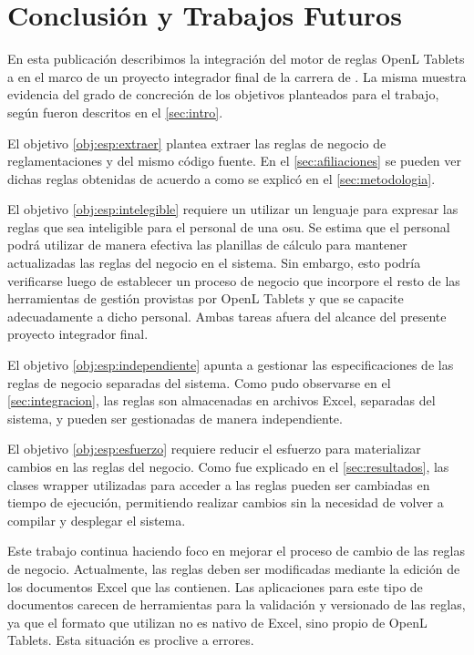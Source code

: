 \section{Conclusión y Trabajos Futuros}\label{sec:conclusiones}

En esta publicación describimos la integración del motor de reglas OpenL Tablets a
{\SIDOSPU} en el marco de un proyecto integrador final de la carrera de {\CARRERA}.
%
La misma muestra evidencia del grado de concreción de los objetivos planteados para el trabajo, según fueron descritos en el \cref{sec:intro}. 

El objetivo \ref{obj:esp:extraer} plantea extraer las reglas de negocio de reglamentaciones y del mismo código fuente. 
En el \cref{sec:afiliaciones} se pueden ver dichas reglas obtenidas de acuerdo a como se explicó en el \cref{sec:metodologia}. 

El objetivo \ref{obj:esp:intelegible} requiere un utilizar un lenguaje para expresar las reglas que sea inteligible para el personal de una \acrshort{osu}.
Se estima que el personal podrá utilizar de manera efectiva las planillas de cálculo para mantener actualizadas las reglas del negocio en el sistema.
Sin embargo, esto podría verificarse luego de establecer un proceso de negocio que incorpore el resto de las herramientas de gestión provistas por OpenL Tablets y que se capacite adecuadamente a dicho personal. 
Ambas tareas afuera del alcance del presente proyecto integrador final.

El objetivo \ref{obj:esp:independiente} apunta a gestionar las especificaciones de las reglas de negocio separadas del sistema. 
Como pudo observarse en el \cref{sec:integracion}, las reglas son almacenadas en archivos Excel, separadas del sistema, y pueden ser gestionadas de manera independiente.

El objetivo \ref{obj:esp:esfuerzo} requiere reducir el esfuerzo para materializar cambios en las reglas del negocio.
Como fue explicado en el \cref{sec:resultados}, las clases wrapper utilizadas para acceder a las reglas pueden ser cambiadas en tiempo de ejecución, permitiendo realizar cambios sin la necesidad de volver a compilar y desplegar el sistema.

Este trabajo continua haciendo foco en mejorar el proceso de cambio de las reglas de negocio.
%
Actualmente, las reglas deben ser modificadas mediante la edición de los documentos Excel que las contienen. 
Las aplicaciones para este tipo de documentos carecen de herramientas para la validación y versionado de las reglas, ya que el formato que utilizan no es nativo de Excel, sino propio de OpenL Tablets.
Esta situación es proclive a errores.

